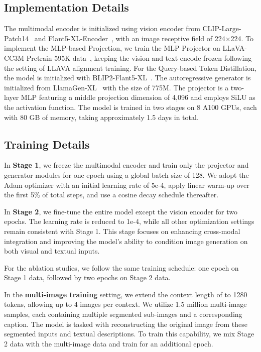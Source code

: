 \subsection{Implementation Details}
\label{app:imp_detail}

The multimodal encoder is initialized using vision encoder from CLIP-Large-Patch14~\citep{Radford2021LearningTV} and Flant5-XL-Encoder~\citep{flant5}, with an image receptive field of 224×224.
To implement the MLP-based Projection, we train the MLP Projector on LLaVA-CC3M-Pretrain-595K data~\citep{liu2023llava}, keeping the vision and text encode frozen following the setting of LLAVA alignment training. For the Query-based Token Distillation, the model is initialized with BLIP2-Flant5-XL~\citep{li2023blip2}.
The autoregressive generator is initialized from LlamaGen-XL~\citep{llamagen} with the size of 775M. The projector is a two-layer MLP featuring a middle projection dimension of 4,096 and employs SiLU as the activation function. 
The model is trained in two stages on 8 A100 GPUs, each with 80 GB of memory, taking approximately 1.5 days in total.

\subsection{Training Details}
\label{app:training_details}

In \textbf{Stage 1}, we freeze the multimodal encoder and train only the projector and generator modules for one epoch using a global batch size of 128. We adopt the Adam optimizer with an initial learning rate of 5e-4, apply linear warm-up over the first 5\% of total steps, and use a cosine decay schedule thereafter.

In \textbf{Stage 2}, we fine-tune the entire model except the vision encoder for two epochs. The learning rate is reduced to 1e-4, while all other optimization settings remain consistent with Stage 1. This stage focuses on enhancing cross-modal integration and improving the model’s ability to condition image generation on both visual and textual inputs.

For the ablation studies, we follow the same training schedule: one epoch on Stage 1 data, followed by two epochs on Stage 2 data.

In the \textbf{multi-image training} setting, we extend the context length of \model to 1280 tokens, allowing up to 4 images per context. We utilize 1.5 million multi-image samples, each containing multiple segmented sub-images and a corresponding caption. The model is tasked with reconstructing the original image from these segmented inputs and textual descriptions. To train this capability, we mix Stage 2 data with the multi-image data and train for an additional epoch.


